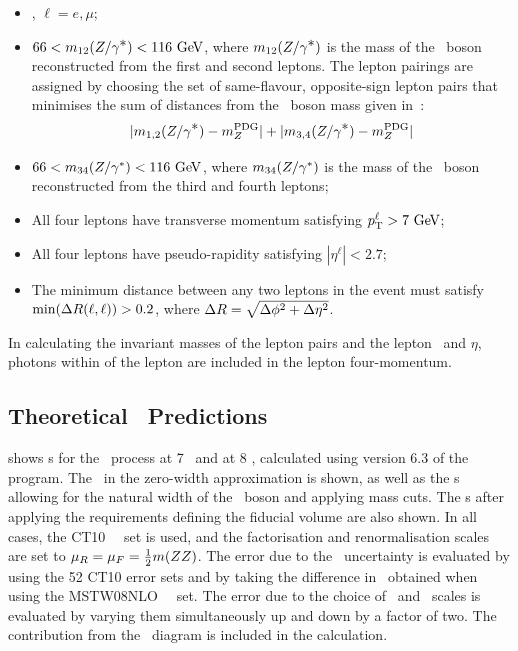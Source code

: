 \begin{itemize}
\item{\ZorgZorgllll, $\ell = e,\mu$;}
\item{ $66 < m_{12}(\Zorgv) <  116\GeV$, where $m_{12}(Z/\gamma^{\textstyle *})$ is
the mass of the \Z\ boson reconstructed from the first and second leptons.  The
lepton pairings are assigned by choosing the set of 
same-flavour, opposite-sign lepton pairs that minimises the sum of distances from
the \Z\ boson mass given in~\cite{PDG}:
\begin{equation}
|m_{1,2}(Z/\gamma^{\textstyle *}) - m_{Z}^{\rm PDG}| + |m_{3,4}(Z/\gamma^{\textstyle *}) - m_{Z}^{\rm PDG}|
\end{equation}
}
\item{ $66 < m_{34}(\Z/\gamma^*) <  116\GeV$, where $m_{34}(Z/\gamma^*)$ is
the mass of the \Z\ boson reconstructed from the third and fourth leptons;}
\item All four leptons have transverse momentum satisfying $\pT^{\ell} > 7\GeV$;
\item All four leptons have pseudo-rapidity satisfying $|\eta^{\ell}| < 2.7$;
\item{ The minimum distance between any two leptons in the event must satisfy
$\mathrm{min}(\Delta R(\ell,\ell)) > 0.2$, where $\Delta R = \sqrt{\Delta \phi^{2} +
\Delta \eta^{2}}$.}
\end{itemize}

In calculating the invariant masses of the lepton pairs and the lepton
\pt\ and $\eta$, photons within
 of the lepton are included in the lepton four-momentum.

\subsection{Theoretical \CX\ Predictions}

 shows \cx s for the \ZZeemm\ process at 7 \tev\ and
at 8 \tev, calculated using version 6.3 of the
\mcfm~\cite{Campbell:2011} program. The \cx\  in the zero-width approximation is shown, as
well as the \cx s allowing for the natural width of the \Z\ boson and
applying mass cuts.  The \cx s after applying the requirements defining
the fiducial volume are also shown. 
In all cases, the CT10~\cite{CT10} \partDF\ set is used, and the factorisation and renormalisation scales are set
to $\mu_{R} = \mu_{F} = \frac{1}{2} m(ZZ)$. The error due to the \partDF\ 
uncertainty is
evaluated by using the 52 CT10 error sets and by taking the difference in \cx\ 
obtained when using the MSTW08NLO~\cite{bib:MSTW2008} \partDF\ set. The error 
due to the choice of
\fact\ and \renorm\ scales is evaluated by varying them
simultaneously up and down by a factor of two. The contribution from the
\gammas\ diagram is included in the calculation.

